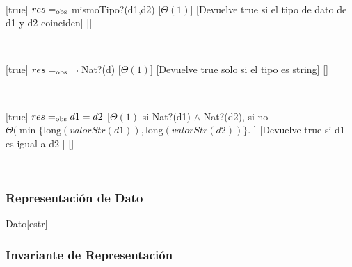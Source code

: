 ~

[true]
{$res =_{\mathrm{obs}}$ mismoTipo?(d1,d2) }
[$\Theta(1)$]
[Devuelve true si el tipo de dato de d1 y d2 coinciden]
[]

~

[true]
{$res =_{\mathrm{obs}}$ $\lnot$ Nat?(d)}
[$\Theta(1)$]
[Devuelve true solo si el tipo es string]
[]

~






[true]
{$res =_{\mathrm{obs}} d1 = d2$}
[$\Theta(1)$ si Nat?(d1) $\land$ Nat?(d2), si no $\Theta(\min\{\text{long}(valorStr(d1)), \text{long}(valorStr(d2))\}$. ]
[Devuelve true si d1 es igual a d2 ]
[]

~ 

\subsubsection{Representación de Dato}

\begin{Estructura}{Dato}[estr]
	\begin{Tupla}[estr]
	\end{Tupla}
\end{Estructura}



\subsubsection{Invariante de Representación}

